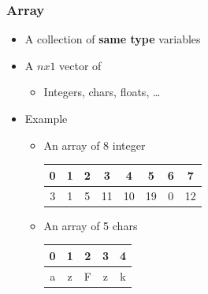 \documentclass{../c-lecture}
\begin{document}
\begin{frame}
  \frametitle{Array}
  \begin{itemize}
    \item A collection of \textbf{\color{Peach}same type} variables
    \item A $nx1$ vector of
    \begin{itemize}
      \item Integers, chars, floats, \ldots
    \end{itemize}
    \item Example
    \begin{itemize}
      \item An array of 8 integer
      \begin{table}
      \begin{tabular}{*{8}{c}}
        \toprule

        0 &
        1 &
        2 &
        3 &
        4 &
        5 &
        6 &
        7 \\

        \midrule

        3 &
        1 &
        5 &
        11 &
        10 &
        19 &
        0 &
        12 \\

        \bottomrule
      \end{tabular}
      \end{table}
      \item An array of 5 chars
      \begin{table}
      \begin{tabular}{*{5}{c}}
        \toprule

        0 &
        1 &
        2 &
        3 &
        4 \\

        \midrule

        a &
        z &
        F &
        z &
        k \\

        \bottomrule
      \end{tabular}
      \end{table}
    \end{itemize}
  \end{itemize}
\end{frame}
\end{document}
